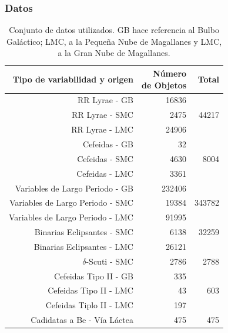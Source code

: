 \documentclass{beamer}
\begin{document}
\begin{frame}
  \frametitle{Datos}
  
  \begin{table}
    \centering  
    \resizebox{0.6\textwidth}{!} {
      \begin{tabular}{rrr}
        \hline
        \hline
        Tipo de variabilidad y origen & \shortstack{Número \\de Objetos} & Total \\
        \hline
        \hline 
        RR Lyrae - GB\cite{soszynski_optical_2011-2} & 16836& \\
        RR Lyrae - SMC \cite{soszynski_optical_2010}& 2475&  44217\\
        RR Lyrae - LMC \cite{soszynski_optical_2009-1}& 24906& \\
        \hline
        Cefeidas - GB \cite{soszynski_optical_2011}& 32 & \\%
        Cefeidas - SMC \cite{soszynski_optical_2010-2}& 4630 & 8004\\
        Cefeidas - LMC \cite{soszynski_optical_2008-1}& 3361 & \\
        \hline
        Variables de Largo Periodo - GB \cite{soszynski_optical_2013-1}& 232406 & \\
        Variables de Largo Periodo - SMC \cite{soszynski_optical_2011-1}& 19384 & 343782\\
        Variables de Largo Periodo -  LMC\cite{soszynski_optical_2009}& 91995 & \\
        \hline
        Binarias Eclipsantes - SMC \cite{pawlak_eclipsing_2013}& 6138 & 32259\\
        Binarias Eclipsantes - LMC \cite{graczyk_optical_2011}& 26121 & \\
        \hline
        $\delta$-Scuti - SMC\cite{poleski_optical_2010} & 2786 & 2788\\
        \hline
        Cefeidas Tipo II - GB \cite{soszynski_optical_2013}& 335 & \\
        Cefeidas Tipo II - LMC \cite{soszynski_optical_2010-1}& 43 & 603\\
        Cefeidas Tiplo II - LMC \cite{soszynski_optical_2008}& 197 & \\
        \hline
        Cadidatas a Be -  Vía Láctea  & 475 & 475\\
        \hline
        \hline 
      \end{tabular}
    } 
    \caption{Conjunto de datos utilizados. GB hace referencia al Bulbo Galáctico; LMC, a la Pequeña Nube de Magallanes y LMC, a la Gran Nube de Magallanes. }
    \label{cuadro:datosUsados}
  \end{table}

\end{frame}
\end{document}
